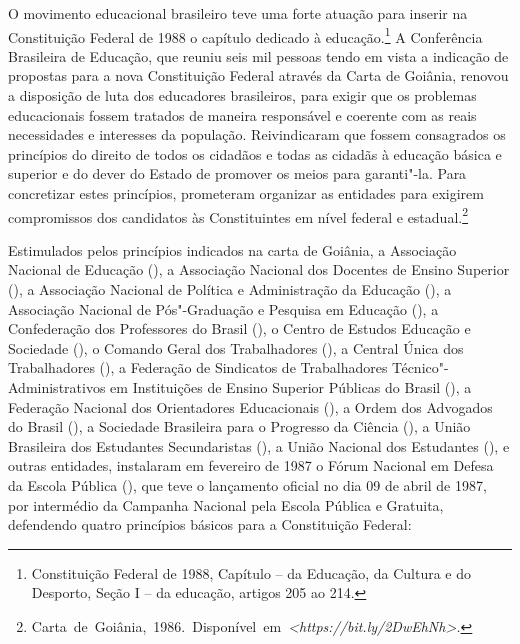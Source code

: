 O movimento educacional brasileiro teve uma forte atuação para inserir
na Constituição Federal de 1988 o capítulo dedicado à educação.\footnote{Constituição
  Federal de 1988, Capítulo  -- da Educação, da Cultura e do
  Desporto, Seção I -- da educação, artigos 205 ao 214.} A  Conferência Brasileira de
Educação, que reuniu seis mil pessoas tendo em vista a indicação de
propostas para a nova Constituição Federal através da Carta de Goiânia,
renovou a disposição de luta dos educadores brasileiros, para exigir que
os problemas educacionais fossem tratados de maneira responsável e
coerente com as reais necessidades e interesses da população.
Reivindicaram que fossem consagrados os princípios do direito de todos
os cidadãos e todas as cidadãs à educação básica e superior e do dever
do Estado de promover os meios para garanti"-la. Para concretizar estes
princípios, prometeram organizar as entidades para exigirem compromissos
dos candidatos às Constituintes em nível federal e estadual.\footnote{\mbox{Carta
de Goiânia, 1986. Disponível em \emph{\textless{}https://bit.ly/2DwEhNh\textgreater{}.}}}

Estimulados pelos princípios indicados na carta de Goiânia, a Associação
Nacional de Educação (), a Associação Nacional dos Docentes de
Ensino Superior (), a Associação Nacional de Política e
Administração da Educação (), a Associação Nacional de
Pós"-Graduação e Pesquisa em Educação (), a Confederação dos
Professores do Brasil (), o Centro de Estudos Educação e Sociedade
(), o Comando Geral dos Trabalhadores (), a Central Única dos
Trabalhadores (), a Federação de Sindicatos de Trabalhadores
Técnico"-Administrativos em Instituições de Ensino Superior Públicas do
Brasil (), a Federação Nacional dos Orientadores Educacionais
(), a Ordem dos Advogados do Brasil (), a Sociedade Brasileira
para o Progresso da Ciência (), a União Brasileira dos Estudantes
Secundaristas (), a União Nacional dos Estudantes (), e outras
entidades, instalaram em fevereiro de 1987 o Fórum Nacional em Defesa da
Escola Pública (), que teve o lançamento oficial no dia 09 de abril
de 1987, por intermédio da Campanha Nacional pela Escola Pública e
Gratuita, defendendo quatro princípios básicos para a Constituição
Federal:

